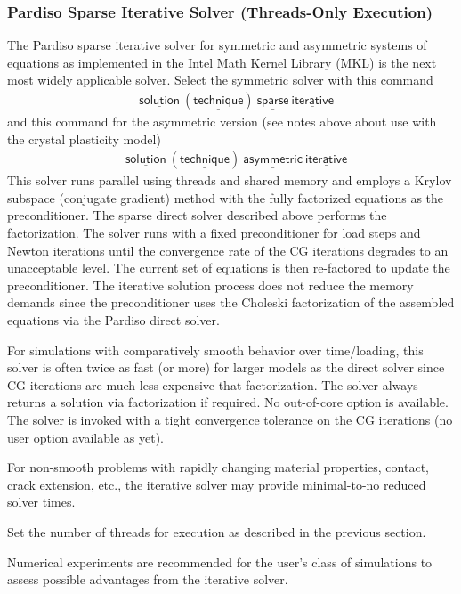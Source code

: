 \documentclass[11pt]{report}
\numberwithin{equation}{section}
\newcommand{\nin} {\noindent}
\newcommand{\ul} {\underline}
\newcommand{\hv} {\mathsf}   %
\begin{document}
\subsubsection{Pardiso Sparse Iterative Solver  (Threads-Only Execution)}
\nin
The Pardiso sparse iterative solver for symmetric and asymmetric systems of equations 
as implemented in the Intel Math Kernel Library (MKL) is the next most widely applicable
solver. Select the symmetric solver with this command
\begin{align*}
&\hv{\ul{solution}\ (\ul{technique})\  \ul{sparse}\ \ul{iterative}} 
\end{align*}
and this command for the asymmetric version (see notes above about use
with the crystal plasticity model)
\begin{align*}
&\hv{\ul{solution}\ (\ul{technique})\  \ul{asymmetric}\ \ul{iterative}} 
\end{align*}
This solver runs parallel using threads and shared memory and employs
a Krylov subspace (conjugate gradient) method with the fully factorized equations as the
preconditioner. The sparse direct solver described above performs
the factorization. The solver runs with a fixed preconditioner for load
steps and Newton iterations until the convergence rate of the CG
iterations degrades to an unacceptable level. The current set of equations
is then re-factored to update the preconditioner. The iterative solution process does
not reduce the memory demands since the preconditioner uses 
the Choleski factorization of the assembled equations via the Pardiso direct solver.

For simulations with comparatively smooth behavior over time/loading,
this solver is often twice as fast (or more) 
for larger models as the direct solver since CG iterations are much
less expensive that factorization. The solver always returns a solution via 
factorization if required. No out-of-core option is available. The solver is invoked
with a tight convergence tolerance on the CG iterations (no user option available as yet).

For non-smooth problems with rapidly changing material properties, contact, crack extension,
etc., the iterative solver may provide minimal-to-no reduced solver times.

Set the number of threads for execution as described in the previous section. 

Numerical experiments are recommended for the user's class of simulations to
assess possible advantages from the iterative solver.
\end{document}
